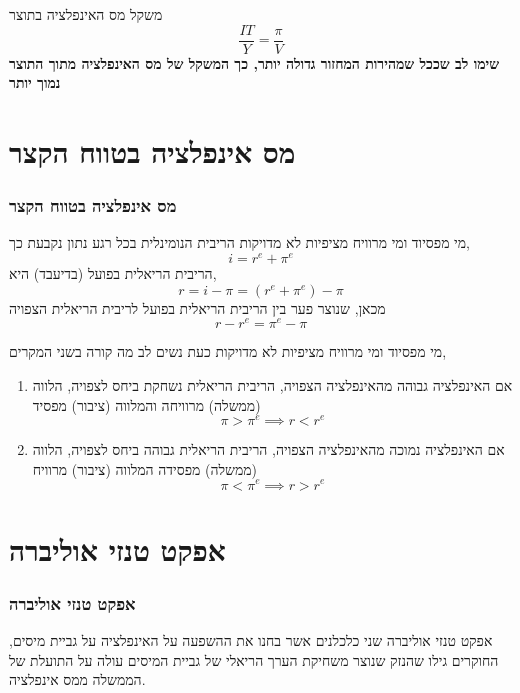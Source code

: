 \documentclass[usenames,dvipsnames]{beamer}
\begin{document}
\begin{RTL}
\begin{frame}
    \begin{block}{משקל מס האינפלציה בתוצר}
        \begin{equation*}
            \frac{IT}{Y} = \frac{\pi}{V}
        \end{equation*}    
        \textbf{שימו לב שככל שמהירות המחזור גדולה יותר, כך המשקל של מס האינפלציה מתוך התוצר נמוך יותר}
    \end{block}
    
    
    

\end{frame}

\section{מס אינפלציה בטווח הקצר}
\begin{frame}[allowframebreaks]
    \frametitle{מס אינפלציה בטווח הקצר}
    \begin{block}{מי מפסיוד ומי מרוויח מציפיות לא מדויקות}
        הריבית הנומינלית בכל רגע נתון נקבעת כך, 
        $$i = r^e + \pi^e$$
        הריבית הריאלית בפועל (בדיעבד) היא,
        $$r = i - \pi = (r^e + \pi^e) - \pi$$
        מכאן, שנוצר פער בין הריבית הריאלית בפועל לריבית הריאלית הצפויה
        $$r - r^e = \pi^e - \pi$$ 
    \end{block}
    \framebreak
    \begin{block}{מי מפסיוד ומי מרוויח מציפיות לא מדויקות}
    כעת נשים לב מה קורה בשני המקרים,
    \begin{enumerate}
        \item אם האינפלציה גבוהה מהאינפלציה הצפויה, הריבית הריאלית נשחקת ביחס לצפויה, הלווה (ממשלה) מרוויחה והמלווה (ציבור) מפסיד
        $$\pi > \pi^e \implies r < r^e$$
        \item אם האינפלציה נמוכה מהאינפלציה הצפויה, הריבית הריאלית גבוהה ביחס לצפויה, הלווה (ממשלה) מפסידה המלווה (ציבור) מרוויח 
        $$\pi < \pi^e \implies r > r^e$$
    \end{enumerate}
    \end{block}

\end{frame}


\section {אפקט טנזי אוליברה}
\begin{frame}
    \frametitle{אפקט טנזי אוליברה}
    \begin{block}{אפקט טנזי אוליברה}
        שני כלכלנים אשר בחנו את ההשפעה על האינפלציה על גביית מיסים, החוקרים גילו שהנזק שנוצר משחיקת
הערך הריאלי של גביית המיסים עולה על התועלת של הממשלה ממס אינפלציה. 
    \end{block}
    

\end{frame}
\end{RTL}
\end{document}
